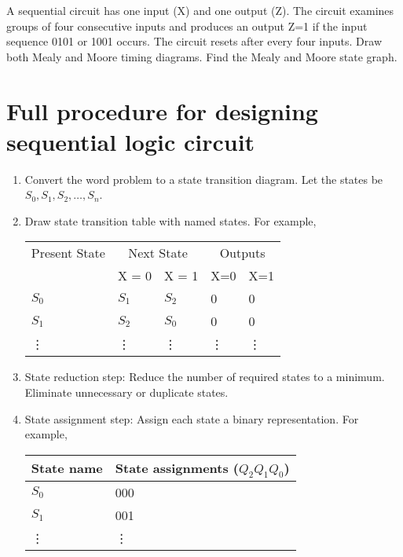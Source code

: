 \begin{example}
  A sequential circuit has one input (X) and one output (Z). The circuit
  examines groups of four consecutive inputs and produces an output Z=1 if the
  input sequence 0101 or 1001 occurs. The circuit resets after every four
  inputs. Draw both Mealy and Moore timing diagrams. Find the Mealy and Moore state graph.
\end{example}
\vspace{20em}

\section{Full procedure for designing sequential logic circuit}

\begin{enumerate}
  \item Convert the word problem to a state transition diagram. Let the states
    be $S_0, S_1, S_2, \dots, S_n$.
  \item Draw state transition table with named states. For example,\\
    \begin{tabular}{lllll}
      \toprule
      Present State & \multicolumn{2}{c}{Next State} & \multicolumn{2}{c}{Outputs} \\
      &  X = 0 & X = 1& X=0 & X=1  \\
      \midrule
       $S_0$ & $S_1$ & $S_2$ & 0 & 0\\
      $S_1$ & $S_2$ & $S_0$ & 0 & 0\\
      \vdots & \vdots & \vdots & \vdots & \vdots  \\
      \bottomrule
    \end{tabular}
   \item State reduction step: Reduce the number of required states to a
     minimum. Eliminate unnecessary or duplicate states.
   \item State assignment step: Assign each state a binary representation. For
     example, \\
     \begin{tabular}{ll}
       \toprule
       State name & State assignments ($Q_2 Q_1 Q_0$)\\
       \midrule
       $S_0$ & 000 \\
       $S_1$ & 001 \\
       \vdots & \vdots\\
       \bottomrule
     \end{tabular}
     

\end{enumerate}
